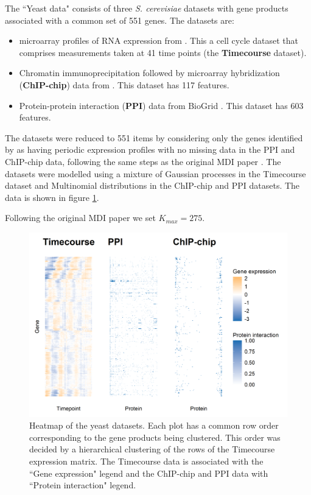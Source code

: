 \documentclass[]{article}
\begin{document}
The ``Yeast data" consists of three \emph{S. cerevisiae} datasets with gene products associated with a common set of 551 genes. The datasets are:
\begin{itemize}
	\item microarray profiles of RNA expression from \cite{granovskaia2010high}. This a cell cycle dataset that comprises measurements taken at 41 time points (the \textbf{Timecourse} dataset).
	\item Chromatin immunoprecipitation followed by microarray hybridization (\textbf{ChIP-chip}) data from \cite{harbison2004transcriptional}. This dataset has 117 features.
	\item Protein-protein interaction (\textbf{PPI}) data from BioGrid \citep{stark2006biogrid}. This dataset has 603 features.
\end{itemize}
The datasets were reduced to 551 items by considering only the genes identified by \cite{granovskaia2010high} as having periodic expression profiles with no missing data in the PPI and ChIP-chip data, following the same steps as the original MDI paper \citep{kirk2012bayesian}. The datasets were modelled using a mixture of Gaussian processes in the Timecourse dataset and Multinomial distributions in the ChIP-chip and PPI datasets. The data is shown in figure \ref{fig:yeastData}.

Following the original MDI paper we set $K_{max}=275$.

\begin{figure}
	\centering
	\includegraphics[scale=0.7]{./Images/Yeast/yeastData.png}
	\caption{Heatmap of the yeast datasets. Each plot has a common row order corresponding to the gene products being clustered. This order was decided by a hierarchical clustering of the rows of the Timecourse expression matrix. The Timecourse data is associated with the ``Gene expression" legend and the ChIP-chip and PPI data with ``Protein interaction" legend.}
	\label{fig:yeastData}
\end{figure}
\end{document}
